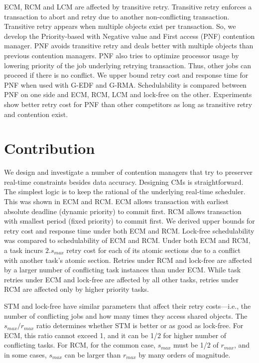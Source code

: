 \documentclass[12pt,english]{report}
\begin{document}
ECM, RCM and LCM are affected by transitive retry. Transitive retry enforces a transaction to abort and retry due to another non-conflicting transaction. Transitive retry appears when multiple objects exist per transaction. So, we develop the Priority-based with Negative value and First access (PNF) contention manager. PNF avoids transitive retry and deals better with multiple objects than previous contention managers. PNF also tries to optimize processor usage by lowering priority of the job underlying retrying transaction. Thus, other jobs can proceed if there is no conflict. We upper bound retry cost and response time for PNF when used with G-EDF and G-RMA. Schedulability is compared between PNF on one side and ECM, RCM, LCM and lock-free on the other. Experiments show better retry cost for PNF than other competitors as long as transitive retry and contention exist.

\section{Contribution}

We design and investigate a number of contention managers that try to preserver real-time constraints besides data accuracy. Designing CMs is straightforward. The simplest logic is to keep the rational of the underlying real-time scheduler. This was shown in ECM and RCM. ECM allows transaction with earliest absolute deadline (dynamic priority) to commit first. RCM allows transaction with smallest period (fixed priority) to commit first. We derived upper bounds for retry cost and response time under both ECM and RCM. Lock-free schedulability was compared to schedulability of ECM and RCM. Under both ECM and RCM, a task incurs $2.s_{max}$ retry cost for each of its atomic sections due to a conflict with another task's atomic section. Retries under RCM and lock-free are affected by a larger number of conflicting task instances than under ECM. While task retries under ECM and lock-free are affected by all other tasks, retries under RCM are affected only by higher priority tasks. 

STM and lock-free have similar parameters that affect their retry costs---i.e., the number of conflicting jobs and how many times they access shared objects. The $s_{max}/r_{max}$ ratio determines whether STM is better or as good as lock-free. For ECM, this ratio cannot exceed 1, and it can be 1/2 for higher number of conflicting tasks. For RCM, for the common case, $s_{max}$ must be 1/2 of $r_{max}$, and in some cases, $s_{max}$ can be larger than $r_{max}$ by many orders of magnitude.
\end{document}
